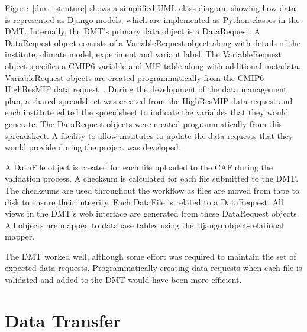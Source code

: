 \documentclass[gmd, manuscript]{copernicus}
\begin{document}
Figure~\ref{dmt_struture} shows a simplified UML class diagram showing how data is represented as Django models, which are implemented as Python classes in the DMT. Internally, the DMT's primary data object is a DataRequest. A DataRequest object consists of a VariableRequest object along with details of the institute, climate model, experiment and variant label. The VariableRequest object specifies a CMIP6 variable and MIP table along with additional metadata. VariableRequest objects are created programmatically from the CMIP6 HighResMIP data request~\citep{Juckes2020}. During the development of the data management plan, a shared spreadsheet was created from the HighResMIP data request and each institute edited the spreadsheet to indicate the variables that they would generate. The DataRequest objects were created programmatically from this spreadsheet. A facility to allow institutes to update the data requests that they would provide during the project was developed.

A DataFile object is created for each file uploaded to the CAF during the validation process. A checksum is calculated for each file submitted to the DMT. The checksums are used throughout the workflow as files are moved from tape to disk to ensure their integrity. Each DataFile is related to a DataRequest. All views in the DMT's web interface are generated from these DataRequest objects. All objects are mapped to database tables using the Django object-relational mapper. 

The DMT worked well, although some effort was required to maintain the set of expected data requests. Programmatically creating data requests  when each file is validated and added to the DMT would have been more efficient.

\section{Data Transfer}
\label{transfer_rates}
\end{document}
